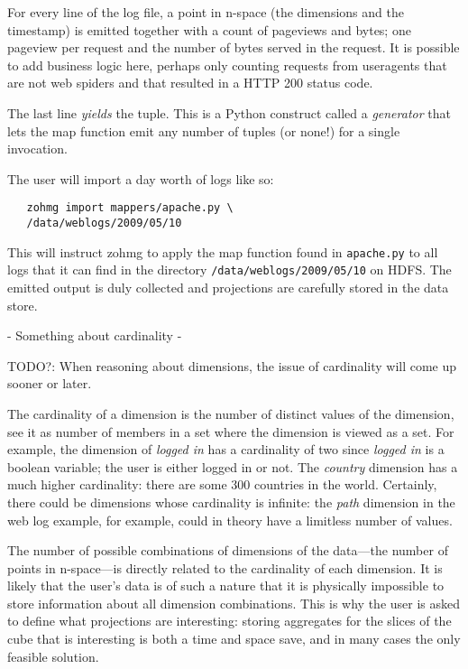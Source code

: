For every line of the log file, a point in n-space (the dimensions and the
timestamp) is emitted together with a count of pageviews and bytes; one
pageview per request and the number of bytes served in the request. It is
possible to add business logic here, perhaps only counting requests from
useragents that are not web spiders and that resulted in a HTTP 200 status
code.

The last line \textit{yields} the tuple. This is a Python construct called a
\textit{generator} that lets the map function emit any number of tuples (or
none!) for a single invocation.

The user will import a day worth of logs like so:

\begin{verbatim}
   zohmg import mappers/apache.py \
   /data/weblogs/2009/05/10
\end{verbatim}

This will instruct zohmg to apply the map function found in \texttt{apache.py}
to all logs that it can find in the directory
\texttt{/data/weblogs/2009/05/10} on HDFS. The emitted output is duly
collected and projections are carefully stored in the data store.

- Something about cardinality -

TODO?: When reasoning about dimensions, the issue of cardinality will come
up sooner or later.

The cardinality of a dimension is the number of distinct values of the
dimension, see it as number of members in a set where the dimension is
viewed as a set. For example, the dimension of \textit{logged in} has a
cardinality of two since \textit{logged in} is a boolean variable; the user
is either logged in or not. The \textit{country} dimension has a much
higher cardinality: there are some 300 countries in the world. Certainly,
there could be dimensions whose cardinality is infinite: the \textit{path}
dimension in the web log example, for example, could in theory have a
limitless number of values.

The number of possible combinations of dimensions of the data---the number
of points in n-space---is directly related to the cardinality of each
dimension. It is likely that the user's data is of such a nature that it is
physically impossible to store information about all dimension
combinations.  This is why the user is asked to define what projections are
interesting: storing aggregates for the slices of the cube that is
interesting is both a time and space save, and in many cases the only
feasible solution.

